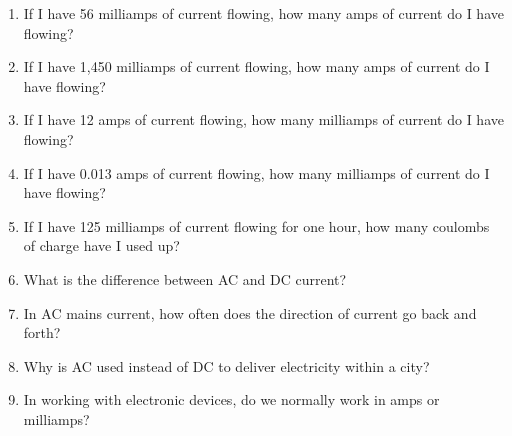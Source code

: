 \applysection

\begin{enumerate}
\item If I have 56 milliamps of current flowing, how many amps of current do I have flowing?
\item If I have 1,450 milliamps of current flowing, how many amps of current do I have flowing?
\item If I have 12 amps of current flowing, how many milliamps of current do I have flowing?
\item If I have 0.013 amps of current flowing, how many milliamps of current do I have flowing?
\item If I have 125 milliamps of current flowing for one hour, how many coulombs of charge have I used up?
\item What is the difference between AC and DC current?
\item In AC mains current, how often does the direction of current go back and forth?
\item Why is AC used instead of DC to deliver electricity within a city?
\item In working with electronic devices, do we normally work in amps or milliamps?
\end{enumerate}
